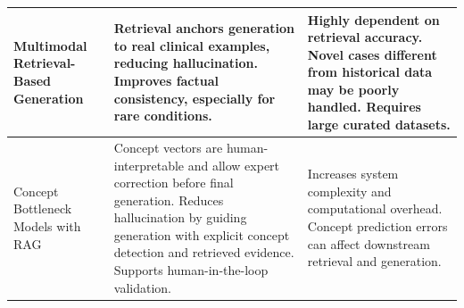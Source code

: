 \begin{table}[h]
\begin{tabular}{|p{4cm}|p{5.5cm}|p{5.5cm}|}
\hline

Multimodal Retrieval-Based Generation 
& Retrieval anchors generation to real clinical examples, reducing hallucination. Improves factual consistency, especially for rare conditions. 
& Highly dependent on retrieval accuracy. Novel cases different from historical data may be poorly handled. Requires large curated datasets. \\

\hline

Concept Bottleneck Models with RAG 
& Concept vectors are human-interpretable and allow expert correction before final generation. Reduces hallucination by guiding generation with explicit concept detection and retrieved evidence. Supports human-in-the-loop validation. 
& Increases system complexity and computational overhead. Concept prediction errors can affect downstream retrieval and generation. \\

\hline

\end{tabular}
\end{table}
